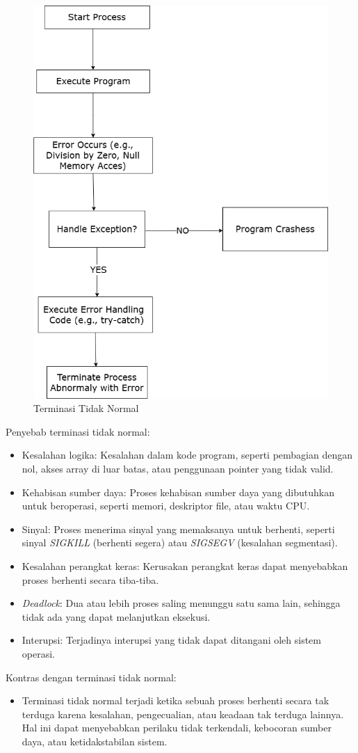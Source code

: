 \documentclass[12pt]{article}
\begin{document}
\begin{itemize}
        \begin{figure}
            \centering
            \includegraphics[width=0.5\linewidth]{asset/Abnormal.png}
            \caption{Terminasi Tidak Normal}
            \label{Abnormal}
        \end{figure}
    
    Penyebab terminasi tidak normal:
    \begin{itemize}
        \item Kesalahan logika: Kesalahan dalam kode program, seperti pembagian dengan nol, akses array di luar batas, atau penggunaan pointer yang tidak valid.
        \item Kehabisan sumber daya: Proses kehabisan sumber daya yang dibutuhkan untuk beroperasi, seperti memori, deskriptor file, atau waktu CPU.
        \item Sinyal: Proses menerima sinyal yang memaksanya untuk berhenti, seperti sinyal\textit{ SIGKILL} (berhenti segera) atau \textit{SIGSEGV} (kesalahan segmentasi).
        \item Kesalahan perangkat keras: Kerusakan perangkat keras dapat menyebabkan proses berhenti secara tiba-tiba.
        \item \textit{Deadlock}: Dua atau lebih proses saling menunggu satu sama lain, sehingga tidak ada yang dapat melanjutkan eksekusi.
        \item Interupsi: Terjadinya interupsi yang tidak dapat ditangani oleh sistem operasi.
    \end{itemize}
    
    Kontras dengan terminasi tidak normal:
    \begin{itemize}
        \item Terminasi tidak normal terjadi ketika sebuah proses berhenti secara tak terduga karena kesalahan, pengecualian, atau keadaan tak terduga lainnya. Hal ini dapat menyebabkan perilaku tidak terkendali, kebocoran sumber daya, atau ketidakstabilan sistem.
    \end{itemize}
    

\end{itemize}
\end{document}
